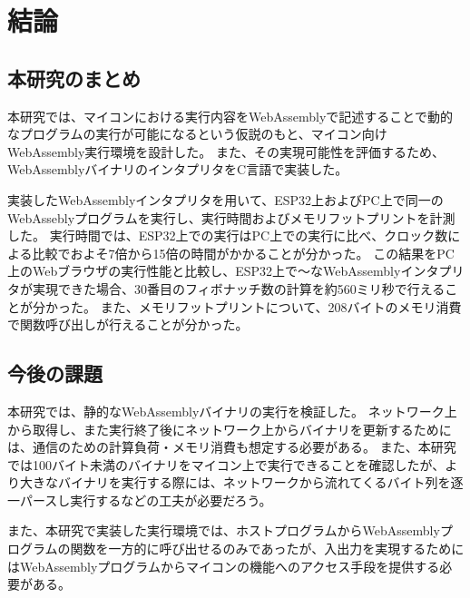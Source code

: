 \chapter{結論}
\label{chap:conclusion}

\section{本研究のまとめ}
\label{section:conclusion}

本研究では、マイコンにおける実行内容をWebAssemblyで記述することで動的なプログラムの実行が可能になるという仮説のもと、マイコン向けWebAssembly実行環境を設計した。
また、その実現可能性を評価するため、WebAssemblyバイナリのインタプリタをC言語で実装した。

実装したWebAssemblyインタプリタを用いて、ESP32上およびPC上で同一のWebAsseblyプログラムを実行し、実行時間およびメモリフットプリントを計測した。
実行時間では、ESP32上での実行はPC上での実行に比べ、クロック数による比較でおよそ7倍から15倍の時間がかかることが分かった。
この結果をPC上のWebブラウザの実行性能と比較し、ESP32上で〜なWebAssemblyインタプリタが実現できた場合、30番目のフィボナッチ数の計算を約560ミリ秒で行えることが分かった。
また、メモリフットプリントについて、208バイトのメモリ消費で関数呼び出しが行えることが分かった。

\section{今後の課題}

本研究では、静的なWebAssemblyバイナリの実行を検証した。
ネットワーク上から取得し、また実行終了後にネットワーク上からバイナリを更新するためには、通信のための計算負荷・メモリ消費も想定する必要がある。
また、本研究では100バイト未満のバイナリをマイコン上で実行できることを確認したが、より大きなバイナリを実行する際には、ネットワークから流れてくるバイト列を逐一パースし実行するなどの工夫が必要だろう。

また、本研究で実装した実行環境では、ホストプログラムからWebAssemblyプログラムの関数を一方的に呼び出せるのみであったが、入出力を実現するためにはWebAssemblyプログラムからマイコンの機能へのアクセス手段を提供する必要がある。
